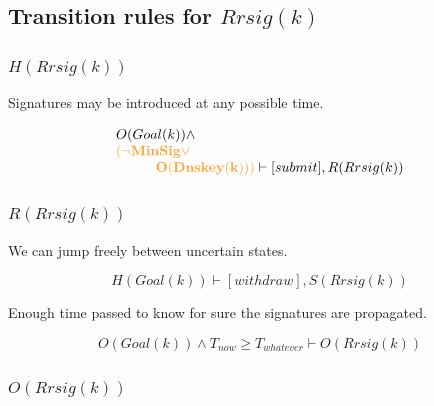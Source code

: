 \documentclass[twoside,english, a4paper]{article}
\newcommand{\highlightMinSig}[1]{\textcolor{MinSig}{\bf{#1}}}
\newcommand{\mathbox}[1]{#1}
\begin{document}
\subsection{Transition rules for $Rrsig(k)$}

\subsubsection{$H(Rrsig(k))$}

\mathbox{
	Signatures may be introduced at any possible time.

	\begin{equation}
		\begin{array}{l}
			O(Goal(k)) \wedge \\
\highlightMinSig{			(\neg MinSig \vee }\\
\highlightMinSig{\hskip 1cm O(Dnskey(k))) }
\vdash [submit], R(Rrsig(k))
		\end{array}
	\end{equation}
}

\subsubsection{$R(Rrsig(k))$}

\mathbox{

	We can jump freely between uncertain states.
	
	\begin{equation}
		H(Goal(k)) \vdash [withdraw], S(Rrsig(k))
	\end{equation}

	Enough time passed to know for sure the signatures are propagated.
	
	\begin{equation}
		O(Goal(k)) \wedge T_{now} \geq T_{whatever} \vdash O(Rrsig(k))
	\end{equation}
}


\subsubsection{$O(Rrsig(k))$}
\end{document}
